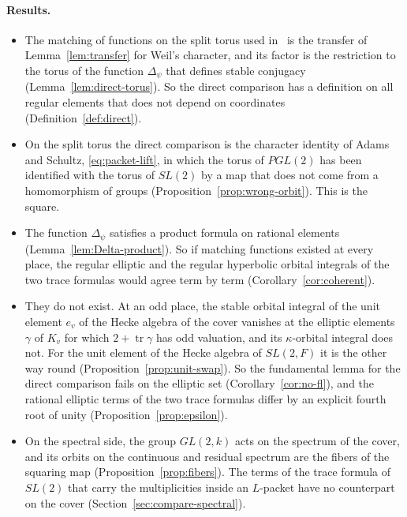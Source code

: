 \paragraph{Results.}
\begin{itemize}
\item The matching of functions on the split torus used in~\cite{JC26} is
  the transfer of Lemma~\ref{lem:transfer} for Weil's character, and its
  factor is the restriction to the torus of the function $\Delta_\psi$
  that defines stable conjugacy (Lemma~\ref{lem:direct-torus}). So the
  direct comparison has a definition on all regular elements that does
  not depend on coordinates (Definition~\ref{def:direct}).
\item On the split torus the direct comparison is the character identity
  of Adams and Schultz, \eqref{eq:packet-lift}, in which the torus of
  $PGL(2)$ has been identified with the torus of $SL(2)$ by a map that
  does not come from a homomorphism of groups
  (Proposition~\ref{prop:wrong-orbit}). This is the square.
\item The function $\Delta_\psi$ satisfies a product formula on rational
  elements (Lemma~\ref{lem:Delta-product}). So if matching functions
  existed at every place, the regular elliptic and the regular hyperbolic
  orbital integrals of the two trace formulas would agree term by term
  (Corollary~\ref{cor:coherent}).
\item They do not exist. At an odd place, the stable orbital integral of
  the unit element $e_v$ of the Hecke algebra of the cover vanishes at
  the elliptic elements $\gamma$ of $K_v$ for which $2+\operatorname{tr}
  \gamma$ has odd valuation, and its $\kappa$-orbital integral does not.
  For the unit element of the Hecke algebra of $SL(2,F)$ it is the other
  way round (Proposition~\ref{prop:unit-swap}). So the fundamental lemma
  for the direct comparison fails on the elliptic set
  (Corollary~\ref{cor:no-fl}), and the rational elliptic terms of the two
  trace formulas differ by an explicit fourth root of unity
  (Proposition~\ref{prop:epsilon}).
\item On the spectral side, the group $GL(2,k)$ acts on the spectrum of
  the cover, and its orbits on the continuous and residual spectrum are
  the fibers of the squaring map (Proposition~\ref{prop:fibers}). The
  terms of the trace formula of $SL(2)$ that carry the multiplicities
  inside an $L$-packet have no counterpart on the cover
  (Section~\ref{sec:compare-spectral}).
\end{itemize}

